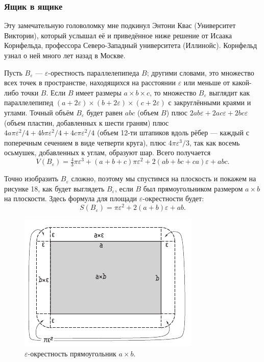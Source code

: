 \subsubsection*{Ящик в ящике}

Эту замечательную головоломку мне подкинул Энтони Квас (Университет Виктории), который услышал её и приведённое ниже решение от Исаака Корнфельда, профессора Северо-Западный университета (Иллинойс).
Корнфельд узнал о ней много лет назад в Москве.

Пусть $B_\varepsilon$ --- $\varepsilon$-орестность параллелепипеда $B$;
другими словами, это множество всех точек в пространстве, находящихся на расстоянии $\varepsilon$ или меньше от какой-либо точки $B$.
Если $B$ имеет размеры $a \times b \times c$, то множество $B_\varepsilon$ выглядит как параллелепипед $(a + 2\varepsilon) \times (b + 2\varepsilon) \times (c + 2\varepsilon)$ с закруглёнными краями и углами.
Точный объём $B_\varepsilon$ будет равен
$abc$ (объем $B$)
плюс $2ab\varepsilon + 2ac\varepsilon + 2bc\varepsilon$ (объем пластин, добавленных к шести граням)
плюс $4a\pi\varepsilon^2 /4 + 4b\pi\varepsilon^2 /4 + 4c\pi\varepsilon^2 /4$ (объем 12-ти штапиков вдоль рёбер --- каждый с поперечным сечением в виде четверти круга),
плюс $4\pi\varepsilon^3 /3$, так как восемь осьмушек, добавленных к углам, образуют шар.
Всего получается
\[V(B_\varepsilon)=\tfrac43\pi\varepsilon^3+(a+b+c)\pi\varepsilon^2+2(ab+bc+ca)\varepsilon+abc.\]

Точно изобразить $B_\varepsilon$ сложно, поэтому мы спустимся на плоскость и покажем на рисунке 18, как будет выглядеть $B_\varepsilon$, если $B$ был прямоугольником размером $a \times b$ на плоскости.
Здесь формула для площади $\varepsilon$-окрестности будет:
\[S(B_\varepsilon)=\pi\varepsilon^2+2(a+b)\varepsilon+ab.\]

\begin{figure}[ht!]
\centering
\includegraphics[scale=1]{pics/box}
\caption{$\varepsilon$-окрестность прямоугольник $a \times b$.}
\label{pic:box}
\end{figure}

